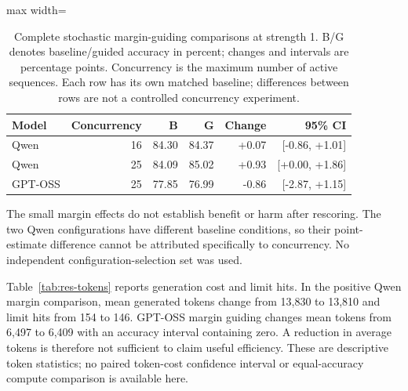 \documentclass[12pt,a4paper,twoside,openright]{book}
\begin{document}
\begin{table}[!ht]
\centering\small
\caption{Complete stochastic margin-guiding comparisons at strength 1. B/G denotes baseline/guided accuracy in percent; changes and intervals are percentage points. Concurrency is the maximum number of active sequences. Each row has its own matched baseline; differences between rows are not a controlled concurrency experiment.}
\label{tab:res-margin}
\begin{adjustbox}{max width=\linewidth}%
\begin{tabular}{lrrrrr}
\toprule
Model & Concurrency & B & G & Change & 95\% CI \\
\midrule
Qwen & 16 & 84.30 & 84.37 & +0.07 & [-0.86, +1.01] \\
Qwen & 25 & 84.09 & 85.02 & +0.93 & [+0.00, +1.86] \\
GPT-OSS & 25 & 77.85 & 76.99 & -0.86 & [-2.87, +1.15] \\
\bottomrule
\end{tabular}
\end{adjustbox}
\end{table}


The small margin effects do not establish benefit or harm after rescoring.
The two Qwen configurations have different baseline conditions, so their
point-estimate difference cannot be attributed specifically to concurrency.
No independent configuration-selection set was used.

Table~\ref{tab:res-tokens} reports generation cost and limit hits. In the
positive Qwen margin comparison, mean generated tokens change from 13,830
to 13,810 and limit hits from 154 to 146. GPT-OSS margin guiding changes
mean tokens from 6,497 to 6,409 with an accuracy interval containing zero. A reduction in
average tokens is therefore not sufficient to claim useful efficiency.
These are descriptive token statistics; no paired token-cost confidence
interval or equal-accuracy compute comparison is available here.
\end{document}
